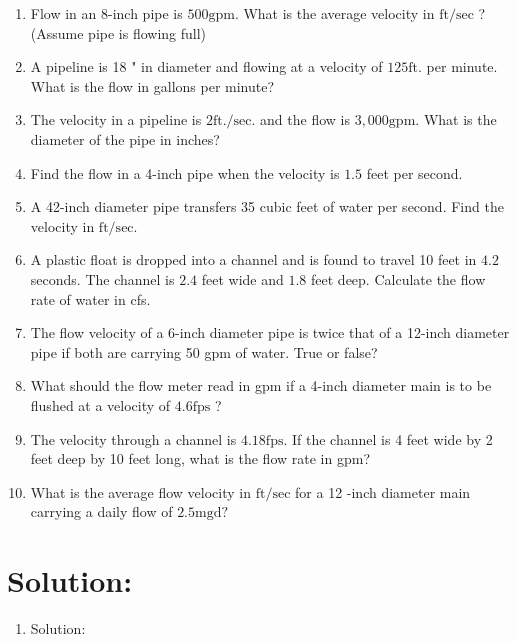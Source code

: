 \documentclass[10pt]{article}
\begin{document}
\begin{enumerate}
\begin{enumerate}
\begin{enumerate}
  \item Flow in an 8-inch pipe is $500 \mathrm{gpm}$. What is the average velocity in $\mathrm{ft} / \mathrm{sec}$ ? (Assume pipe is flowing full)

  \item A pipeline is 18 " in diameter and flowing at a velocity of $125 \mathrm{ft}$. per minute. What is the flow in gallons per minute?

  \item The velocity in a pipeline is $2 \mathrm{ft} . / \mathrm{sec}$. and the flow is $3,000 \mathrm{gpm}$. What is the diameter of the pipe in inches?

  \item Find the flow in a 4-inch pipe when the velocity is $1.5$ feet per second.

  \item A 42-inch diameter pipe transfers 35 cubic feet of water per second. Find the velocity in $\mathrm{ft} / \mathrm{sec}$.

  \item A plastic float is dropped into a channel and is found to travel 10 feet in $4.2$ seconds. The channel is $2.4$ feet wide and $1.8$ feet deep. Calculate the flow rate of water in cfs.

  \item The flow velocity of a 6-inch diameter pipe is twice that of a 12-inch diameter pipe if both are carrying 50 gpm of water. True or false?

  \item What should the flow meter read in gpm if a 4-inch diameter main is to be flushed at a velocity of $4.6 \mathrm{fps}$ ?

  \item The velocity through a channel is $4.18 \mathrm{fps}$. If the channel is 4 feet wide by 2 feet deep by 10 feet long, what is the flow rate in gpm?

  \item What is the average flow velocity in $\mathrm{ft} / \mathrm{sec}$ for a 12 -inch diameter main carrying a daily flow of $2.5 \mathrm{mgd} ?$

\end{enumerate}

\section{Solution:}
\begin{enumerate}
  \item Solution:
\end{enumerate}


\end{enumerate}
\end{enumerate}
\end{document}
